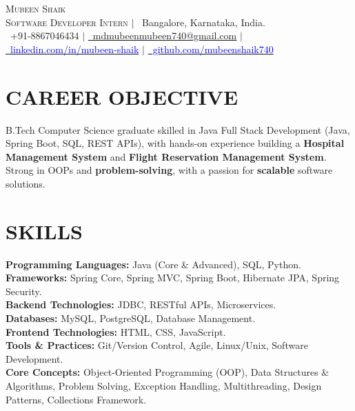 \documentclass[letterpaper,11pt]{article}
\begin{document}
\begin{center}
    \vspace{-5pt}
    {\fontsize{32pt}{32pt}\selectfont \scshape Mubeen Shaik} \\ \vspace{8pt}
    {\fontsize{16pt}{16pt}\selectfont \scshape Software Developer Intern}
    \quad $|$ \quad
    {\fontsize{11pt}{17pt}\selectfont \faMapMarker*\ Bangalore, Karnataka, India.} \\ \vspace{5pt}
    {\fontsize{11pt}{17pt}\selectfont
    \faPhone\ +91-8867046434 \quad
     \quad $|$ \quad
    \href{mailto:mdmubeenmubeen740@gmail.com}
    {\faEnvelope\ mdmubeenmubeen740@gmail.com} \quad
     \quad $|$ \quad
    \href{https://www.linkedin.com/in/mubeen-shaik-a02717275}
    {\textcolor{blue}{\faLinkedin\ linkedin.com/in/mubeen-shaik}} \quad
     \quad $|$ \quad
    \href{https://github.com/mubeenshaik740/projects}
    {\textcolor{blue}{\faGithub\ github.com/mubeenshaik740}}
    }
\end{center}
\vspace{-11pt}

\section{CAREER OBJECTIVE}
\vspace{2pt}
{\fontsize{11pt}{17pt}\selectfont B.Tech Computer Science graduate skilled in Java Full Stack Development (Java, Spring Boot, SQL, REST APIs), with hands-on experience building a \textbf{Hospital Management System} and \textbf{Flight Reservation Management System}. Strong in OOPs and \textbf{problem-solving}, with a passion for \textbf{scalable} software solutions.}

\section{SKILLS}
\vspace{1pt}
\normalsize{
\textbf{Programming Languages:} Java (Core \& Advanced), SQL, Python. \\
\textbf{Frameworks:} Spring Core, Spring MVC, Spring Boot, Hibernate JPA, Spring Security. \\
\textbf{Backend Technologies:} JDBC, RESTful APIs, Microservices. \\
\textbf{Databases:} MySQL, PostgreSQL, Database Management. \\
\textbf{Frontend Technologies:} HTML, CSS, JavaScript. \\
\textbf{Tools \& Practices:} Git/Version Control, Agile, Linux/Unix, Software Development. \\
\textbf{Core Concepts:} Object-Oriented Programming (OOP), Data Structures \& Algorithms, Problem Solving, Exception Handling, Multithreading, Design Patterns, Collections Framework.
}
\end{document}
